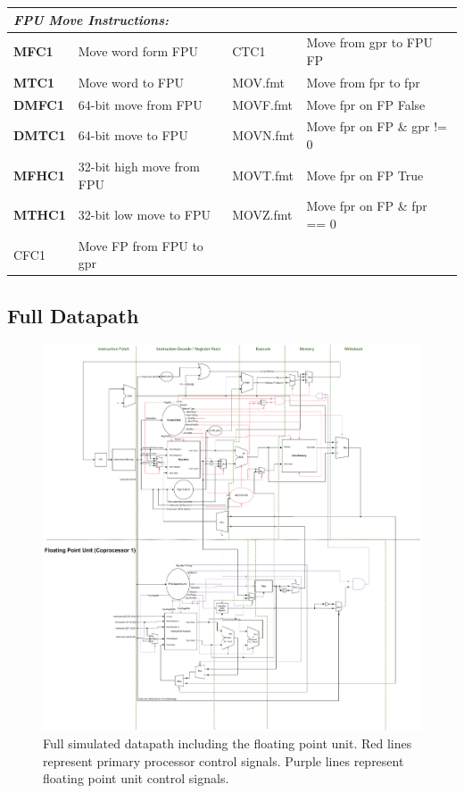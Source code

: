 \documentclass[parskip=half, fontsize=12pt]{scrartcl}
\begin{document}
\begin{tabularx}{\textwidth}{@{}lX|lX@{}}
    \multicolumn{4}{l}{\emph{FPU Move Instructions:}} \\\hline
    \textbf{MFC1}  & Move word form FPU        & CTC1     & Move from gpr to FPU FP \\
    \textbf{MTC1}  & Move word to FPU          & MOV.fmt  & Move from fpr to fpr \\
    \textbf{DMFC1} & 64-bit move from FPU      & MOVF.fmt & Move fpr on FP False \\
    \textbf{DMTC1} & 64-bit move to FPU        & MOVN.fmt & Move fpr on FP \& gpr != 0 \\
    \textbf{MFHC1} & 32-bit high move from FPU & MOVT.fmt & Move fpr on FP True \\
    \textbf{MTHC1} & 32-bit low move to FPU    & MOVZ.fmt & Move fpr on FP \& fpr == 0 \\
    CFC1           & Move FP from FPU to gpr   &          & \\
\end{tabularx}

\subsection{Full Datapath}

\begin{figure}[H]
    \includegraphics[width=\textwidth]{swim-datapath}
    \caption{Full simulated datapath including the floating point unit. Red lines represent primary processor control signals. Purple lines represent floating point unit control signals.}
\end{figure}
\end{document}
